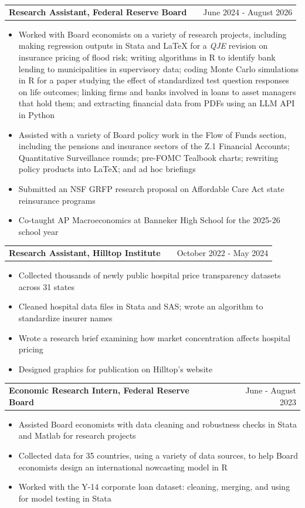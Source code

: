 \documentclass[a4paper,11pt]{article}
\makeatletter
\newenvironment{joblong}[2]
    {
    \begin{tabularx}{\linewidth}{@{}l X r@{}}
    \textbf{#1} & \hfill &  #2 \\[3.75pt]
    \end{tabularx}
    \begin{minipage}[t]{\linewidth}
    \begin{itemize}[nosep,after=\strut, leftmargin=1em, itemsep=3pt,label=--]
    }
    {
    \end{itemize}
    \end{minipage}    
    }
\makeatother
\begin{document}
\begin{joblong}{Research Assistant, Federal Reserve Board}{June 2024 - August 2026}
\item Worked with Board economists on a variety of research projects, including making regression outputs in Stata and LaTeX for a \textit{QJE} revision on insurance pricing of flood risk; writing algorithms in R to identify bank lending to municipalities in supervisory data; coding Monte Carlo simulations in R for a paper studying the effect of standardized test question responses on life outcomes; linking firms and banks involved in loans to asset managers that hold them; and extracting financial data from PDFs using an LLM API in Python
\item Assisted with a variety of Board policy work in the Flow of Funds section, including the pensions and insurance sectors of the Z.1 Financial Accounts; Quantitative Surveillance rounds; pre-FOMC Tealbook charts; rewriting policy products into LaTeX; and ad hoc briefings
\item Submitted an NSF GRFP research proposal on Affordable Care Act state reinsurance programs
\item Co-taught AP Macroeconomics at Banneker High School for the 2025-26 school year
\end{joblong}

\begin{joblong}{Research Assistant, Hilltop Institute}{October 2022 - May 2024}
\item Collected thousands of newly public hospital price transparency datasets across 31 states
\item Cleaned hospital data files in Stata and SAS; wrote an algorithm to standardize insurer names
\item Wrote a research brief examining how market concentration affects hospital pricing
\item Designed graphics for publication on Hilltop's website
\end{joblong}

\begin{joblong}{Economic Research Intern, Federal Reserve Board}{June - August 2023}
\item Assisted Board economists with data cleaning and robustness checks in Stata and Matlab for research projects
\item Collected data for 35 countries, using a variety of data sources, to help Board economists design an international nowcasting model in R
\item Worked with the Y-14 corporate loan dataset: cleaning, merging, and using for model testing in Stata
\end{joblong}
\end{document}
